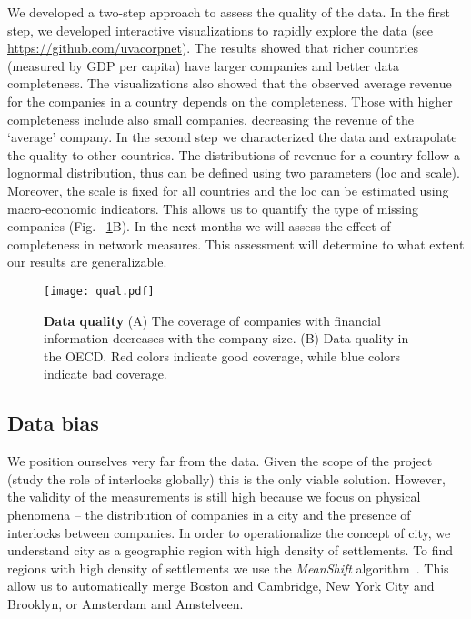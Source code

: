 We developed a two-step approach to assess the quality of the data. In the first step, we developed interactive visualizations to rapidly explore the data (see \url{https://github.com/uvacorpnet}). The results showed that richer countries (measured by GDP per capita) have larger companies and better data completeness. 
The visualizations also showed that the observed average revenue for the companies in a country depends on the completeness. 
Those with higher completeness include also small companies, 
decreasing the revenue of the `average' company. 
In the second step we characterized the data and extrapolate the quality to other countries. 
The distributions of revenue for a country follow a lognormal distribution, 
thus can be defined using two parameters (loc and scale). 
Moreover, the scale is fixed for all countries and the loc can be estimated using macro-economic indicators. 
This allows us to quantify the type of missing companies (Fig. ~\ref{fig:qual}B). 
In the next months we will assess the effect of completeness in network measures. 
This assessment will determine to what extent our results are generalizable. 

\begin{figure}
\begin{center}
\texttt{[image: qual.pdf]}
\caption{\textbf{Data quality} (A) The coverage of companies with financial information decreases with the company size. (B) Data quality in the OECD. Red colors indicate good coverage, while blue colors indicate bad coverage.}
\label{fig:qual}
\end{center}
\end{figure}

\subsection{Data bias}
We position ourselves very far from the data. 
Given the scope of the project (study the role of interlocks globally) this is the only viable solution.  
However, the validity of the measurements is still high because we focus on physical phenomena 
-- the distribution of companies in a city and the presence of interlocks between companies.
In order to operationalize the concept of city, 
we understand city as a geographic region with high density of settlements.
To find regions with high density of settlements 
we use the \textit{MeanShift} algorithm~\citep{fukunaga1975}.
This allow us to automatically merge Boston and Cambridge, New York City and Brooklyn, or Amsterdam and Amstelveen.


